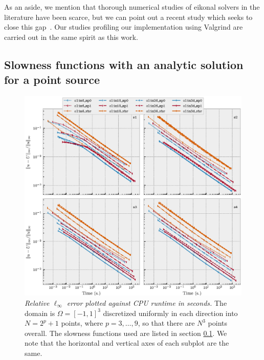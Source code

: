\documentclass[smallcondensed]{svjour3}
\begin{document}
As an aside, we mention that thorough numerical studies of eikonal
solvers in the literature have been scarce, but we can point out a
recent study which seeks to close this gap~\cite{gomez2019fast}. Our
studies profiling our implementation using Valgrind are carried out in
the same spirit as this work.

\subsection[Single point source]{Slowness functions with an analytic
  solution for a point source}\label{ssec:point-source-problems}

\begin{figure}
  \centering \includegraphics[width=\linewidth]{time_vs_error_3d.eps}
  \caption{\emph{Relative $\ell_\infty$ error plotted against CPU
      runtime in seconds.} The domain is $\Omega = [-1, 1]^3$
    discretized uniformly in each direction into $N = 2^p + 1$ points,
    where $p = 3, \hdots, 9$, so that there are $N^3$ points
    overall. The slowness functions used are listed in section\@
    \ref{ssec:point-source-problems}. We note that the horizontal and
    vertical axes of each subplot are the
    same.}\label{fig:time-vs-error}
\end{figure}
\end{document}
